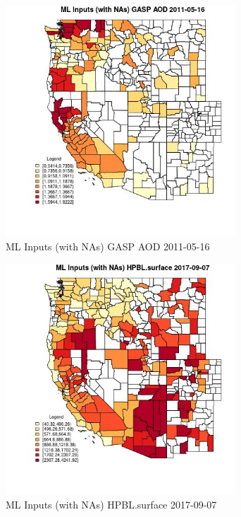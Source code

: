 \begin{figure} 
\centering  
\includegraphics[width=0.77\textwidth]{Code_Outputs/Report_ML_input_PM25_Step4_part_e_de_duplicated_aves_compiled_2019-05-21wNAs_CountyGASP_AODMean2011-05-16.jpg} 
\caption{\label{fig:Report_ML_input_PM25_Step4_part_e_de_duplicated_aves_compiled_2019-05-21wNAsCountyGASP_AODMean2011-05-16}ML Inputs (with NAs) GASP AOD 2011-05-16} 
\end{figure} 
 

\begin{figure} 
\centering  
\includegraphics[width=0.77\textwidth]{Code_Outputs/Report_ML_input_PM25_Step4_part_e_de_duplicated_aves_compiled_2019-05-21wNAs_CountyHPBLsurfaceMean2017-09-07.jpg} 
\caption{\label{fig:Report_ML_input_PM25_Step4_part_e_de_duplicated_aves_compiled_2019-05-21wNAsCountyHPBLsurfaceMean2017-09-07}ML Inputs (with NAs) HPBL.surface 2017-09-07} 
\end{figure} 
 

